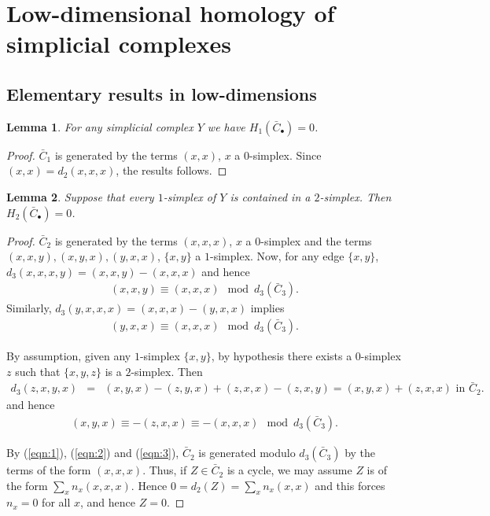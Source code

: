 \documentclass[12pt]{amsart}
\newtheorem{lem}{Lemma}[section]
\theoremstyle{definition}
\newcommand{\<}{\langle}
\renewcommand{\>}{\rangle}
\begin{document}
\section{Low-dimensional homology of simplicial complexes}\label{sec:lowdim}


\subsection{Elementary results in low-dimensions}
\begin{lem}  For any simplicial complex $Y$ we have $H_1(\bar{C}_\bullet)=0$.
\end{lem}
\begin{proof} $\bar{C}_1$ is generated by the terms $(x,x)$, $x$ a $0$-simplex. Since $(x,x)=d_2(x,x,x)$, the results follows.
\end{proof}

\begin{lem}\label{lem:c2} Suppose that every $1$-simplex of  $Y$  is contained in a $2$-simplex. Then $H_2(\bar{C}_\bullet)=0$.
\end{lem}

\begin{proof}  $\bar{C}_2$ is generated by the terms $(x,x,x)$, $x$  a $0$-simplex and the terms\\
 $(x,x,y), (x,y,x), (y,x,x)$, $\{ x,y\}$ a $1$-simplex.  Now, for any edge $\{ x,y\}$,
$
d_3(x,x,x,y)=(x,x,y)-(x,x,x)$ and hence 
\begin{eqnarray}\label{eqn:1}
(x,x,y)\equiv (x,x,x)\mod{d_3(\bar{C}_3)}.
\end{eqnarray}
Similarly, $d_3(y,x,x,x)=(x,x,x)-(y,x,x)$ implies
\begin{eqnarray}\label{eqn:2}
(y,x,x)\equiv (x,x,x)\mod{d_3(\bar{C}_3)}.
\end{eqnarray}

By assumption, given any $1$-simplex $\{ x,y\}$, by hypothesis there exists a $0$-simplex $z$ such that $\{ x,y,z\}$ is a $2$-simplex. Then 
\begin{eqnarray*}
d_3(z,x,y,x)&=& (x,y,x)-(z,y,x)+(z,x,x)-(z,x,y)= (x,y,x)+(z,x,x) \mbox{ in } \bar{C}_2.
\end{eqnarray*}
and hence 
\begin{eqnarray}\label{eqn:3}
(x,y,x)\equiv-(z,x,x)\equiv - (x,x,x)\mod{d_3(\bar{C}_3)}.
\end{eqnarray}

By (\ref{eqn:1}), (\ref{eqn:2}) and (\ref{eqn:3}), $\bar{C}_2$  is generated modulo $d_3(\bar{C}_3)$ by the terms of the form $(x,x,x)$. Thus, if $Z\in \bar{C}_2$ is a cycle, we may assume $Z$ is of the form $\sum_x n_x(x,x,x)$. Hence $0=d_2(Z)=\sum_x n_x(x,x)$ and this forces $n_x=0$ for all $x$, and hence $Z=0$.
\end{proof}
\end{document}
